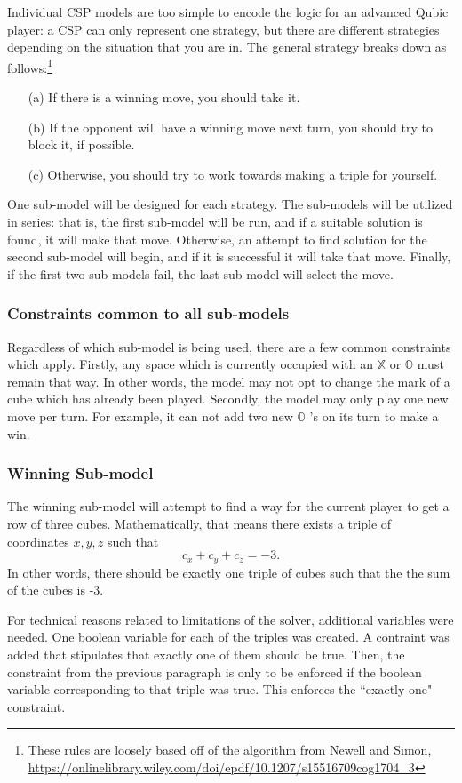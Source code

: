 \documentclass[11pt]{article}
\newcommand{\XX}{$\mathbb{X}$ }
\newcommand{\OO}{$\mathbb{O}$ }
\begin{document}
Individual CSP models are too simple to encode the logic for an advanced Qubic player: a CSP can only represent one strategy, but there are different strategies depending on the situation that you are in. The general strategy breaks down as follows:\footnote{These rules are loosely based off of the algorithm from Newell and Simon, \url{https://onlinelibrary.wiley.com/doi/epdf/10.1207/s15516709cog1704_3}}
\begin{enumerate}
    \item[(a)] If there is a winning move, you should take it.
    \item[(b)] If the opponent will have a winning move next turn, you should try to block it, if possible.
    \item[(c)] Otherwise, you should try to work towards making a triple for yourself.
\end{enumerate}
One sub-model will be designed for each strategy. The sub-models will be utilized in series: that is, the first sub-model will be run, and if a suitable solution is found, it will make that move. Otherwise, an attempt to find solution for the second sub-model will begin, and if it is successful it will take that move. Finally, if the first two sub-models fail, the last sub-model will select the move.

\subsubsection{Constraints common to all sub-models}
Regardless of which sub-model is being used, there are a few common constraints which apply. Firstly, any space which is currently occupied with an \XX or \OO must remain that way. In other words, the model may not opt to change the mark of a cube which has already been played. Secondly, the model may only play one new move per turn. For example, it can not add two new \OO's on its turn to make a win.

\subsubsection{Winning Sub-model}
The winning sub-model will attempt to find a way for the current player to get a row of three cubes. Mathematically, that means there exists a triple of coordinates $x, y, z$ such that
$$ c_x + c_y + c_z = -3.$$
In other words, there should be exactly one triple of cubes such that the the sum of the cubes is -3.

For technical reasons related to limitations of the solver, additional variables were needed. One boolean variable for each of the triples was created. A contraint was added that stipulates that exactly one of them should be true. Then, the constraint from the previous paragraph is only to be enforced if the boolean variable corresponding to that triple was true. This enforces the ``exactly one" constraint.
\end{document}

